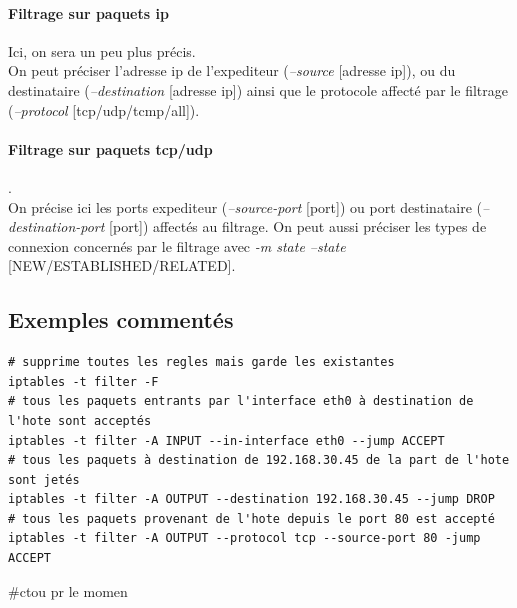 \documentclass{article}
\begin{document}
\paragraph{Filtrage sur paquets ip}
Ici, on sera un peu plus précis.\\
On peut préciser l'adresse ip de l'expediteur (\emph{--source} [adresse ip]), ou du destinataire (\emph{--destination} [adresse ip]) ainsi que le protocole affecté par le filtrage (\emph{--protocol} [tcp/udp/tcmp/all]).

\paragraph{Filtrage sur paquets tcp/udp}.\\
On précise ici les ports expediteur (\emph{--source-port} [port]) ou port destinataire (\emph{--destination-port} [port]) affectés au filtrage. On peut aussi préciser les types de connexion concernés par le filtrage avec \emph{-m state --state} [NEW/ESTABLISHED/RELATED].

\subsection{Exemples commentés}
\begin{verbatim}
# supprime toutes les regles mais garde les existantes
iptables -t filter -F
# tous les paquets entrants par l'interface eth0 à destination de l'hote sont acceptés
iptables -t filter -A INPUT --in-interface eth0 --jump ACCEPT
# tous les paquets à destination de 192.168.30.45 de la part de l'hote sont jetés
iptables -t filter -A OUTPUT --destination 192.168.30.45 --jump DROP
# tous les paquets provenant de l'hote depuis le port 80 est accepté
iptables -t filter -A OUTPUT --protocol tcp --source-port 80 -jump ACCEPT
\end{verbatim}

\#ctou pr le momen
\end{document}
